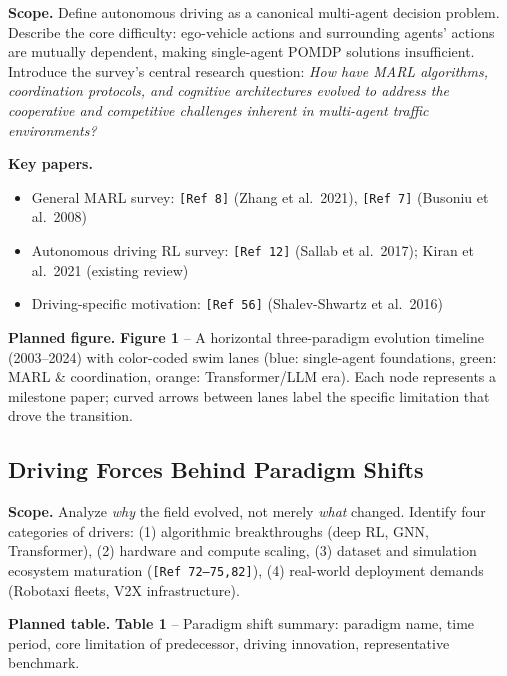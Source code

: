 \documentclass[12pt, a4paper]{article}
\begin{document}
\begin{outline_note}
\textbf{Scope.}
Define autonomous driving as a canonical multi-agent decision problem.
Describe the core difficulty: ego-vehicle actions and surrounding agents'
actions are mutually dependent, making single-agent POMDP solutions
insufficient.  Introduce the survey's central research question:
\emph{How have MARL algorithms, coordination protocols, and cognitive
architectures evolved to address the cooperative and competitive challenges
inherent in multi-agent traffic environments?}

\textbf{Key papers.}
\begin{itemize}[nosep]
  \item General MARL survey: \texttt{[Ref\,8]} (Zhang et al.\ 2021),
        \texttt{[Ref\,7]} (Busoniu et al.\ 2008)
  \item Autonomous driving RL survey: \texttt{[Ref\,12]} (Sallab et al.\ 2017);
        Kiran et al.\ 2021 (existing review)
  \item Driving-specific motivation: \texttt{[Ref\,56]} (Shalev-Shwartz et al.\ 2016)
\end{itemize}

\textbf{Planned figure.}
\textbf{Figure 1} -- A horizontal three-paradigm evolution timeline (2003--2024)
with color-coded swim lanes (blue: single-agent foundations, green: MARL \&
coordination, orange: Transformer/LLM era).  Each node represents a milestone
paper; curved arrows between lanes label the specific limitation that drove
the transition.
\end{outline_note}

\subsection{Driving Forces Behind Paradigm Shifts}

\begin{outline_note}
\textbf{Scope.}
Analyze \emph{why} the field evolved, not merely \emph{what} changed.
Identify four categories of drivers:
(1) algorithmic breakthroughs (deep RL, GNN, Transformer),
(2) hardware and compute scaling,
(3) dataset and simulation ecosystem maturation (\texttt{[Ref\,72--75,82]}),
(4) real-world deployment demands (Robotaxi fleets, V2X infrastructure).

\textbf{Planned table.}
\textbf{Table 1} -- Paradigm shift summary: paradigm name, time period,
core limitation of predecessor, driving innovation, representative benchmark.
\end{outline_note}
\end{document}
